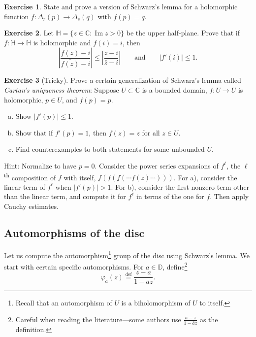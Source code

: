 \documentclass[12pt,openany]{book}
\newcommand{\glsadd}[2][]{}
\renewcommand{\Im}{\operatorname{Im}}
\newcommand{\abs}[1]{\left\lvert {#1} \right\rvert}
\newcommand{\C}{{\mathbb{C}}}
\newcommand{\D}{{\mathbb{D}}}
\newcommand{\bH}{{\mathbb{H}}}
\newcommand{\myindex}[1]{#1\index{#1}}
\theoremstyle{plain}
\theoremstyle{remark}
\theoremstyle{definition}
\newenvironment{exbox}{%
    \def\FrameCommand{\vrule width 1pt \relax\hspace{10pt}}%
    \MakeFramed{\advance\hsize-\width\FrameRestore}%
}{%
    \endMakeFramed
}
\newenvironment{exparts}{%
    \leavevmode\begin{enumerate}[a),noitemsep,topsep=0pt,parsep=0pt,partopsep=0pt]
}{%
    \end{enumerate}
}
\theoremstyle{exercise}
\newtheorem{exercise}{Exercise}[section]
\theoremstyle{example}
\begin{document}
\begin{exbox}
\begin{exercise}
State and prove a version of Schwarz's lemma for a holomorphic
function $f \colon \Delta_r(p) \to \Delta_s(q)$ with $f(p)=q$.
\end{exercise}

\begin{exercise}
Let $\bH = \{ z \in \C : \Im z > 0 \}$ be the upper half-plane.
Prove that if $f \colon \bH \to \bH$ is holomorphic and $f(i) = i$, then
\begin{equation*}
\abs{\frac{f(z)-i}{\overline{f(z)}-i}} \leq
\abs{\frac{z-i}{\bar{z}-i}} 
\qquad
\text{and}
\qquad
\abs{f'(i)} \leq 1 .
\end{equation*}
\end{exercise}

\begin{exercise}[Tricky]
\pagebreak[3]
Prove a certain generalization of Schwarz's lemma
called \emph{\myindex{Cartan's uniqueness theorem}}:
Suppose $U \subset \C$
is a bounded domain,
$f \colon U \to U$ is holomorphic,
$p \in U$,
and $f(p)=p$.
\begin{exparts}
\item
Show $\abs{f'(p)} \leq 1$.
\item
Show that if $f'(p) = 1$, then $f(z) = z$ for all $z \in U$.
\item
Find counterexamples to both statements for some unbounded $U$.
\end{exparts}
Hint: Normalize to have $p=0$.  Consider the power series
expansions of
$f^{\ell}$, the $\ell$\textsuperscript{th} composition of $f$ with itself,
$f(f(f(\cdots f(z) \cdots)))$.
For a), consider the linear term of $f^{\ell}$ when $\abs{f'(p)}
> 1$.  For b), consider the first nonzero term other
than the linear term, and compute it for $f^{\ell}$ in terms
of the one for $f$.  Then apply Cauchy estimates.
\end{exercise}
\end{exbox}

\subsection{Automorphisms of the disc}

Let us compute the automorphism\footnote{Recall that an automorphism of $U$ is a
biholomorphism of $U$ to itself.}
group of the disc using Schwarz's lemma.
We start with certain specific automorphisms.
For $a \in \D$, define\footnote{%
Careful when reading the literature---some authors use $\frac{a-z}{1-\bar{a}z}$ as the definition.}
\glsadd{not:varphia}%
\begin{equation*}
\varphi_a(z) \overset{\text{def}}{=} \frac{z-a}{1-\bar{a}z}.
\end{equation*}
\end{document}
